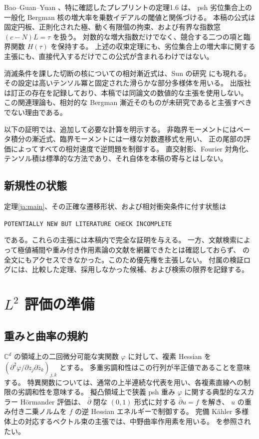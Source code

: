 \documentclass[12pt]{amsart}
\theoremstyle{definition}
\theoremstyle{remark}
\numberwithin{equation}{section}
\newcommand{\C}{\mathbb{C}}
\theoremstyle{definition}
\begin{document}
Bao--Guan--Yuan \cite{BGY25}、特に確認したプレプリントの定理1.6 は、
psh 劣位集合上の一般化 Bergman 核の増大率を乗数イデアルの閾値と関係づける。
本稿の公式は固定円板、正則化された極、動く有限個の拘束、および有界な指数窓 $(c-N)L=\tau$ を扱う。
対数的な増大指数だけでなく、競合する二つの項と臨界関数 $H(\tau)$ を保持する。
上述の収束定理にも、劣位集合上の増大率に関する主張にも、直接代入するだけでこの公式が含まれるわけではない。

消滅条件を課した切断の核についての相対漸近式は、Sun の研究 \cite{Sun21} にも現れる。
その設定は高いテンソル冪と固定された滑らかな部分多様体を用いる。
出版社は訂正の存在を記録しており、本稿では同論文の数値的な主張を使用しない。
この関連理論も、相対的な Bergman 漸近そのものが未研究であると主張すべきでない理由である。

以下の証明では、追加して必要な計算を明示する。
非臨界モーメントにはベータ積分の漸近式、臨界モーメントには一様な対数遷移式を用い、
正の尾部の評価によってすべての相対速度で逆問題を制御する。
直交射影、Fourier 対角化、テンソル積は標準的な方法であり、それ自体を本稿の寄与とはしない。

\subsection{新規性の状態}
定理\ref{ja:main}、その正確な遷移形状、および相対衝突条件に付す状態は
\begin{center}\small
\texttt{POTENTIALLY NEW BUT LITERATURE CHECK INCOMPLETE}
\end{center}
である。これらの主張には本稿内で完全な証明を与える。
一方、文献検索によって極値補間や重み付き作用素論の文献を網羅できたとは確認しておらず、
\cite{LXZ23} の全文にもアクセスできなかった。このため優先権を主張しない。
付属の検証ログには、比較した定理、採用しなかった候補、および検索の限界を記録する。

\section{\texorpdfstring{$L^2$}{L2} 評価の準備}
\subsection{重みと曲率の規約}
$\C^d$ の領域上の二回微分可能な実関数 $\varphi$ に対して、複素 Hessian を
$(\partial^2\varphi/\partial z_j\partial\bar z_k)_{j,k}$ とする。
多重劣調和性はこの行列が半正値であることを意味する。
特異関数については、通常の上半連続な代表を用い、各複素直線への制限の劣調和性を意味する。
擬凸領域上で狭義 psh 重み $\varphi$ に関する典型的なスカラー H\"ormander 評価は、
$\bar\partial$ 閉な $(0,1)$ 形式に対する $\bar\partial u=f$ を解き、
$u$ の重み付き二乗ノルムを $f$ の逆 Hessian エネルギーで制御する。
完備 K\"ahler 多様体上の対応するベクトル束の主張では、中野曲率作用素を用いる。
\cite{H65,D82} を参照されたい。
\end{document}
